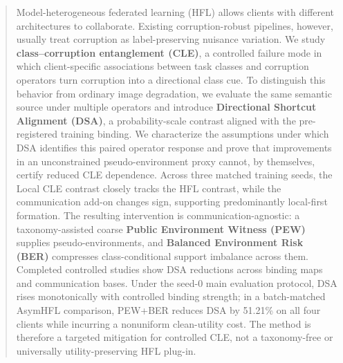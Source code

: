 \begin{abstract}

Model-heterogeneous federated learning (HFL) allows clients with different architectures to collaborate. Existing corruption-robust pipelines, however, usually treat corruption as label-preserving nuisance variation. We study \textbf{class--corruption entanglement (CLE)}, a controlled failure mode in which client-specific associations between task classes and corruption operators turn corruption into a directional class cue. To distinguish this behavior from ordinary image degradation, we evaluate the same semantic source under multiple operators and introduce \textbf{Directional Shortcut Alignment (DSA)}, a probability-scale contrast aligned with the pre-registered training binding. We characterize the assumptions under which DSA identifies this paired operator response and prove that improvements in an unconstrained pseudo-environment proxy cannot, by themselves, certify reduced CLE dependence. Across three matched training seeds, the Local CLE contrast closely tracks the HFL contrast, while the communication add-on changes sign, supporting predominantly local-first formation. The resulting intervention is communication-agnostic: a taxonomy-assisted coarse \textbf{Public Environment Witness (PEW)} supplies pseudo-environments, and \textbf{Balanced Environment Risk (BER)} compresses class-conditional support imbalance across them. Completed controlled studies show DSA reductions across binding maps and communication bases. Under the seed-0 main evaluation protocol, DSA rises monotonically with controlled binding strength; in a batch-matched AsymHFL comparison, PEW+BER reduces DSA by 51.21\% on all four clients while incurring a nonuniform clean-utility cost. The method is therefore a targeted mitigation for controlled CLE, not a taxonomy-free or universally utility-preserving HFL plug-in.
\ifdraftskeleton
{}
\fi

\end{abstract}
